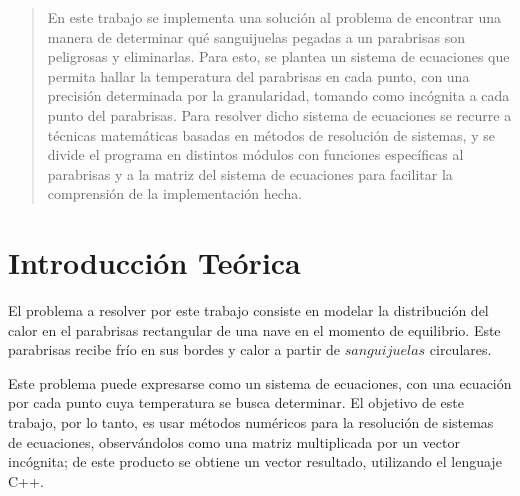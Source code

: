 \documentclass[a4paper]{article}
\begin{document}
\thispagestyle{empty}

\maketitle
\newpage

\thispagestyle{empty}
\vfill
\begin{abstract}
En este trabajo se implementa una solución al problema de encontrar una manera de determinar qué sanguijuelas pegadas a un parabrisas son peligrosas y eliminarlas. Para esto, se plantea un sistema de ecuaciones que  permita hallar la temperatura del parabrisas en cada punto, con una precisión determinada por la granularidad, tomando como incógnita a cada punto del parabrisas.\newline
Para resolver dicho sistema de ecuaciones se recurre a técnicas matemáticas basadas en métodos de resolución de sistemas, y se divide el programa en distintos módulos con funciones específicas al parabrisas y a la matriz del sistema de ecuaciones para facilitar la comprensión de la implementación hecha.
\end{abstract}

\thispagestyle{empty}
\vspace{3cm}
\tableofcontents
\newpage


\newpage

\section{Introducci\'{o}n Te\'{o}rica}
\label{sec:intro}

El problema a resolver por este trabajo consiste en modelar la distribución del calor en el parabrisas rectangular de una nave en el momento de equilibrio. Este parabrisas recibe frío en sus bordes y calor a partir de $sanguijuelas$ circulares.

Este problema puede expresarse como un sistema de ecuaciones, con una ecuación por cada punto cuya temperatura se busca determinar. El objetivo de este trabajo, por lo tanto, es usar métodos numéricos para la resolución de sistemas de ecuaciones, observándolos como una matriz multiplicada por un vector incógnita; de este producto se obtiene un vector resultado, utilizando el lenguaje C++.
\end{document}
